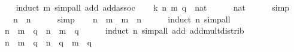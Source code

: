 \begin{isabellebody}
%
\isadelimproof
\ \ %
\endisadelimproof
%
\isatagproof
{}\isamarkupfalse%
\ {\isacharparenleft}{\kern0pt}induct\ m{\isacharparenright}{\kern0pt}\ {\isacharparenleft}{\kern0pt}simp{\isacharunderscore}{\kern0pt}all\ add{\isacharcolon}{\kern0pt}\ add{\isachardot}{\kern0pt}assoc{\isacharparenright}{\kern0pt}%
\endisatagproof
{\isafoldproof}%
%
\isadelimproof
\isanewline
%
\endisadelimproof
\isanewline
{}\isamarkupfalse%
\isanewline
%
\isadelimproof
%
\endisadelimproof
%
\isatagproof
{}\isamarkupfalse%
\isanewline
\ \ \isamarkupfalse%
\ k\ n\ m\ q\ {\isacharcolon}{\kern0pt}{\isacharcolon}{\kern0pt}\ nat\isanewline
\ \ \isamarkupfalse%
\ {\isachardoublequoteopen}{}\ {\isasymnoteq}\ {\isacharparenleft}{\kern0pt}{}{\isacharcolon}{\kern0pt}{\isacharcolon}{\kern0pt}nat{\isacharparenright}{\kern0pt}{\isachardoublequoteclose}\isanewline
\ \ \ \ \isamarkupfalse%
\ simp\isanewline
\ \ \isamarkupfalse%
\ {\isachardoublequoteopen}{}\ {\isacharasterisk}{\kern0pt}\ n\ {\isacharequal}{\kern0pt}\ n{\isachardoublequoteclose}\isanewline
\ \ \ \ \isamarkupfalse%
\ simp\isanewline
\ \ \isamarkupfalse%
\ {\isachardoublequoteopen}n\ {\isacharasterisk}{\kern0pt}\ m\ {\isacharequal}{\kern0pt}\ m\ {\isacharasterisk}{\kern0pt}\ n{\isachardoublequoteclose}\isanewline
\ \ \ \ \isamarkupfalse%
\ {\isacharparenleft}{\kern0pt}induct\ n{\isacharparenright}{\kern0pt}\ simp{\isacharunderscore}{\kern0pt}all\isanewline
\ \ \isamarkupfalse%
\ {\isachardoublequoteopen}{\isacharparenleft}{\kern0pt}n\ {\isacharasterisk}{\kern0pt}\ m{\isacharparenright}{\kern0pt}\ {\isacharasterisk}{\kern0pt}\ q\ {\isacharequal}{\kern0pt}\ n\ {\isacharasterisk}{\kern0pt}\ {\isacharparenleft}{\kern0pt}m\ {\isacharasterisk}{\kern0pt}\ q{\isacharparenright}{\kern0pt}{\isachardoublequoteclose}\isanewline
\ \ \ \ \isamarkupfalse%
\ {\isacharparenleft}{\kern0pt}induct\ n{\isacharparenright}{\kern0pt}\ {\isacharparenleft}{\kern0pt}simp{\isacharunderscore}{\kern0pt}all\ add{\isacharcolon}{\kern0pt}\ add{\isacharunderscore}{\kern0pt}mult{\isacharunderscore}{\kern0pt}distrib{\isacharparenright}{\kern0pt}\isanewline
\ \ \isamarkupfalse%
\ {\isachardoublequoteopen}{\isacharparenleft}{\kern0pt}n\ {\isacharplus}{\kern0pt}\ m{\isacharparenright}{\kern0pt}\ {\isacharasterisk}{\kern0pt}\ q\ {\isacharequal}{\kern0pt}\ n\ {\isacharasterisk}{\kern0pt}\ q\ {\isacharplus}{\kern0pt}\ m\ {\isacharasterisk}{\kern0pt}\ q{\isachardoublequoteclose}\isanewline

\end{isabellebody}
